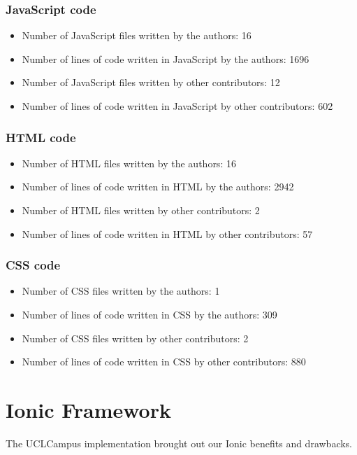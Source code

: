 \documentclass{eplmastersthesis}
\begin{document}
\subsubsection{JavaScript code}

\begin{itemize}
\item Number of JavaScript files written by the authors: 16
\item Number of lines of code written in JavaScript by the authors: 1696
\item Number of JavaScript files written by other contributors: 12
\item Number of lines of code written in JavaScript by other contributors: 602
\end{itemize}

\subsubsection{HTML code}

\begin{itemize}
\item Number of HTML files written by the authors: 16
\item Number of lines of code written in HTML by the authors: 2942
\item Number of HTML files written by other contributors: 2
\item Number of lines of code written in HTML by other contributors: 57
\end{itemize}

\subsubsection{CSS code}

\begin{itemize}
\item Number of CSS files written by the authors: 1
\item Number of lines of code written in CSS by the authors: 309
\item Number of CSS files written by other contributors: 2
\item Number of lines of code written in CSS by other contributors: 880
\end{itemize}




\section{Ionic Framework}
The UCLCampus implementation brought out our Ionic benefits and drawbacks.
\end{document}
